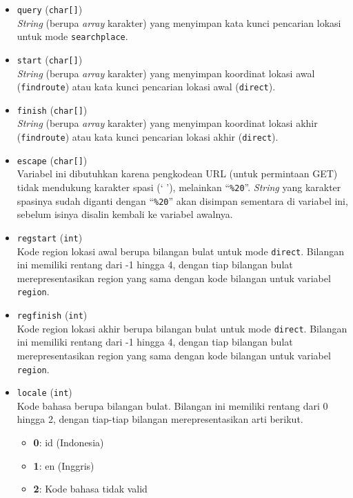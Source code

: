 \begin{itemize}
	\item \verb|query| (\verb|char[]|) \\
	\textit{String} (berupa \textit{array} karakter) yang menyimpan kata kunci pencarian lokasi untuk mode \verb|searchplace|.
	\item \verb|start| (\verb|char[]|) \\
	\textit{String} (berupa \textit{array} karakter) yang menyimpan koordinat lokasi awal (\verb|findroute|) atau kata kunci pencarian lokasi awal (\verb|direct|).
	\item \verb|finish| (\verb|char[]|) \\
	\textit{String} (berupa \textit{array} karakter) yang menyimpan koordinat lokasi akhir (\verb|findroute|) atau kata kunci pencarian lokasi akhir (\verb|direct|).
	\newpage %
	\item \verb|escape| (\verb|char[]|) \\
	Variabel ini dibutuhkan karena pengkodean URL (untuk permintaan GET) tidak mendukung karakter spasi (` '), melainkan ``\verb|%20|''. \textit{String} yang karakter spasinya sudah diganti dengan ``\verb|%20|'' akan disimpan sementara di variabel ini, sebelum isinya disalin kembali ke variabel awalnya.
	\item \verb|regstart| (\verb|int|) \\
	Kode region lokasi awal berupa bilangan bulat untuk mode \verb|direct|. Bilangan ini memiliki rentang dari -1 hingga 4, dengan tiap bilangan bulat merepresentasikan region yang sama dengan kode bilangan untuk variabel \verb|region|.
	\item \verb|regfinish| (\verb|int|) \\
	Kode region lokasi akhir berupa bilangan bulat untuk mode \verb|direct|. Bilangan ini memiliki rentang dari -1 hingga 4, dengan tiap bilangan bulat merepresentasikan region yang sama dengan kode bilangan untuk variabel \verb|region|.
	\item \verb|locale| (\verb|int|) \\
	Kode bahasa berupa bilangan bulat. Bilangan ini memiliki rentang dari 0 hingga 2, dengan tiap-tiap bilangan merepresentasikan arti berikut.
	
	\begin{itemize}
		\item \textbf{0}: id (Indonesia)
		\item \textbf{1}: en (Inggris)
		\item \textbf{2}: Kode bahasa tidak valid
	\end{itemize}
	

\end{itemize}
